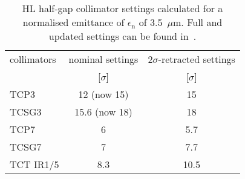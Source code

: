 \begin{table}%
   \centering
   \caption{HL half-gap collimator settings calculated for a normalised emittance of $\epsilon_{\mathrm{n}}$ of 3.5~$\mu$m. Full and updated settings can be found in~\cite{collSettRef}.}

   \begin{tabular}{l|c|c}
       \hline
       collimators &        nominal settings & $2\sigma$-retracted settings\\
                   &         [$\sigma$] &  [$\sigma$]\\
       \hline
       TCP3 & 12 (now 15) & 15 \\
       TCSG3 & 15.6 (now 18)& 18 \\
       TCP7 & 6 & 5.7 \\
       TCSG7 & 7 & 7.7 \\
       TCT IR1/5 & 8.3 & 10.5 \\
       \hline
   \end{tabular}
   \label{collSettings}
\end{table}
